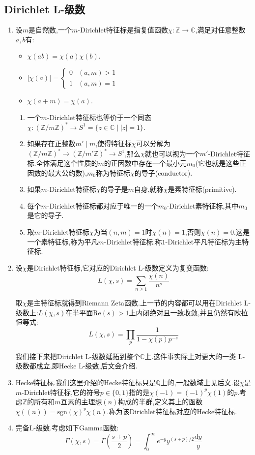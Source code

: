 \subsection{Dirichlet L-级数}
\begin{enumerate}
	\item 设$m$是自然数,一个$m$-Dirichlet特征标是指复值函数$\chi:\mathbb{Z}\to\mathbb{C}$,满足对任意整数$a,b$有:
	\begin{itemize}
		\item $\chi(ab)=\chi(a)\chi(b)$.
		\item $|\chi(a)|=\left\{\begin{array}{cc}0&(a,m)>1\\1&(a,m)=1\end{array}\right.$
		\item $\chi(a+m)=\chi(a)$.
	\end{itemize}
	\begin{enumerate}[(1)]
		\item 一个$m$-Dirichlet特征标也等价于一个同态$\chi:(\mathbb{Z}/m\mathbb{Z})^*\to S^1=\{z\in\mathbb{C}\mid|z|=1\}$.
		\item 如果存在正整数$m'\mid m$,使得特征标$\chi$可以分解为$(\mathbb{Z}/m\mathbb{Z})^*\to(\mathbb{Z}/m'\mathbb{Z})^*\to S^1$,那么$\chi$就也可以视为一个$m'$-Dirichlet特征标.全体满足这个性质的$m$的正因数中存在一个最小元$m_0$(它也就是这些正因数的最大公约数),$m_0$称为特征标$\chi$的导子(conductor).
		\item 如果$m$-Dirichlet特征标$\chi$的导子是$m$自身,就称$\chi$是素特征标(primitive).
		\item 每个$m$-Dirichlet特征标都对应于唯一的一个$m_0$-Dirichlet素特征标,其中$m_0$是它的导子.
		\item 取$m$-Dirichlet特征标$\chi$为当$(n,m)=1$时$\chi(n)=1$,否则$\chi(n)=0$.这是一个素特征标,称为平凡$m$-Dirichlet特征标.称$1$-Dirichlet平凡特征标为主特征标.
	\end{enumerate}
    \item 设$\chi$是Dirichlet特征标,它对应的Dirichlet L-级数定义为复变函数:
    $$L(\chi,s)=\sum_{n\ge1}\frac{\chi(n)}{n^s}$$
    
    取$\chi$是主特征标就得到Riemann Zeta函数.上一节的内容都可以用在Dirichlet L-级数上:$L(\chi,s)$在半平面$\mathrm{Re}(s)>1$上内闭绝对且一致收敛,并且仍然有欧拉恒等式:
    $$L(\chi,s)=\prod_p\frac{1}{1-\chi(p)p^{-s}}$$
    
    我们接下来把Dirichlet L-级数延拓到整个$\mathbb{C}$上.这件事实际上对更大的一类 L-级数都成立,即Hecke L-级数,后文会介绍.
    \item Hecke特征标.我们这里介绍的Hecke特征标只是$\mathbb{Q}$上的,一般数域上见后文.设$\chi$是$m$-Dirichlet特征标,它的符号$p\in\{0,1\}$指的是$\chi(-1)=(-1)^p\chi(1)$的$p$.考虑$\mathbb{Z}$的所有和$m$互素的主理想$(n)$构成的半群,定义其上的函数$\chi((n))=\mathrm{sgn}(\chi)^p\chi(n)$.称为该Dirichlet特征标对应的Hecke特征标.
    \item 完备L-级数.考虑如下Gamma函数:
    $$\Gamma(\chi,s)=\Gamma\left(\frac{s+p}{2}\right)=\int_0^{\infty}e^{-y}y^{(s+p)/2}\frac{\mathrm{d}y}{y}$$
    

\end{enumerate}
